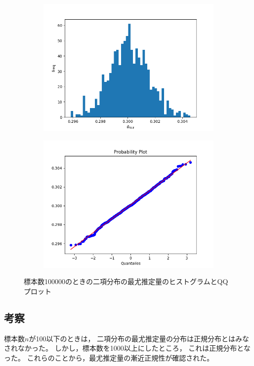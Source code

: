 \documentclass[class=jsarticle, crop=false, dvipdfmx, fleqn]{standalone}
\begin{document}
\begin{figure}
	\centering
    \begin{minipage}{0.45\linewidth}
        \begin{figure}[H]
            \centering
            \includegraphics[clip, width=\linewidth]{../figures/hist_n100000.png}
            \label{fig:hist_n100000}
        \end{figure}
    \end{minipage}
    \begin{minipage}{0.45\linewidth}
        \begin{figure}[H]
            \centering
            \includegraphics[clip, width=\linewidth]{../figures/qqplot_n100000.png}
            \label{fig:qqplot_n100000}
        \end{figure}
    \end{minipage}
    \caption{標本数100000のときの二項分布の最尤推定量のヒストグラムとQQプロット}
    \label{fig:n100000}
\end{figure}



\subsection*{考察}

標本数\(n\)が100以下のときは，
二項分布の最尤推定量の分布は正規分布とはみなされなかった。
しかし，標本数を1000以上にしたところ，
これは正規分布となった。
これらのことから，最尤推定量の漸近正規性が確認された。
\end{document}
